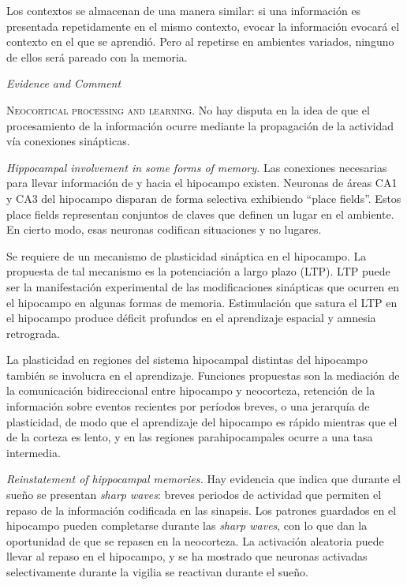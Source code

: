 \documentclass[a4paper,12pt]{article}
\begin{document}
Los contextos se almacenan de una manera similar: si una información es presentada repetidamente en el mismo contexto, evocar la información evocará el contexto en el que se aprendió. Pero al repetirse en ambientes variados, ninguno de ellos será pareado con la memoria.

{\itshape Evidence and Comment}

{\scshape Neocortical processing and learning.} No hay disputa en la idea de que el procesamiento de la información ocurre mediante la propagación de la actividad vía conexiones sinápticas. 

{\itshape Hippocampal involvement in some forms of memory.} Las conexiones necesarias para llevar información de y hacia el hipocampo existen. Neuronas de áreas CA1 y CA3 del hipocampo disparan de forma selectiva exhibiendo ``place fields''. Estos place fields representan conjuntos de claves que definen un lugar en el ambiente. En cierto modo, esas neuronas codifican situaciones y no lugares.

Se requiere de un mecanismo de plasticidad sináptica en el hipocampo. La propuesta de tal mecanismo es la potenciación a largo plazo (LTP). LTP puede ser la manifestación experimental de las modificaciones sinápticas que ocurren en el hipocampo en algunas formas de memoria. Estimulación que satura el LTP en el hipocampo produce déficit profundos en el aprendizaje espacial y amnesia retrograda. 

La plasticidad en regiones del sistema hipocampal distintas del  hipocampo también se involucra en el aprendizaje. Funciones propuestas son la mediación de la comunicación bidireccional entre hipocampo y neocorteza, retención de la información sobre eventos recientes por períodos breves, o una jerarquía de plasticidad, de modo que el aprendizaje del hipocampo es rápido mientras que el de la corteza es lento, y en las regiones parahipocampales ocurre a una tasa intermedia.

{\itshape Reinstatement of hippocampal memories.} Hay evidencia que indica que durante el sueño se presentan {\itshape sharp waves}: breves periodos de actividad que permiten el repaso de la información codificada en las sinapsis. Los patrones guardados en el hipocampo pueden completarse durante las {\itshape sharp waves}, con lo que dan la oportunidad de que se repasen en la neocorteza. La activación aleatoria puede llevar al repaso en el hipocampo, y se ha mostrado que neuronas activadas selectivamente durante la vigilia se reactivan durante el sueño.
\end{document}
